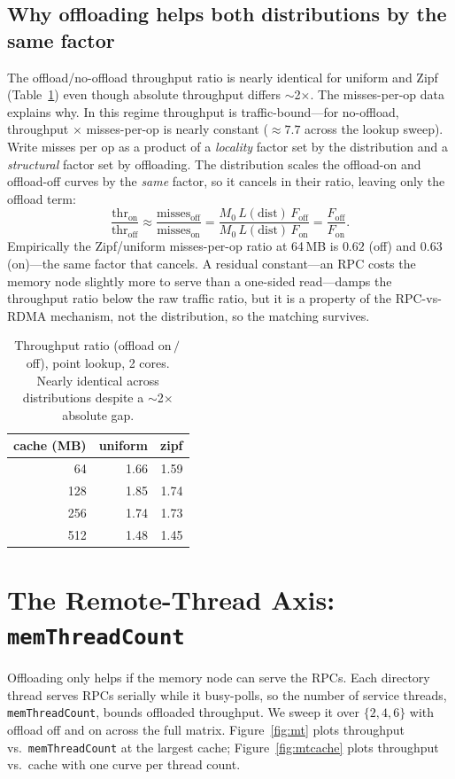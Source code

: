 \documentclass[sigconf,nonacm]{acmart}
\begin{document}
\subsection{Why offloading helps both distributions by the same factor}
The offload/no-offload throughput ratio is nearly identical for uniform and Zipf
(Table~\ref{tab:ratio}) even though absolute throughput differs $\sim$2$\times$.
The misses-per-op data explains why. In this regime throughput is
traffic-bound---for no-offload, throughput$\,\times\,$misses-per-op is nearly
constant ($\approx7.7$ across the lookup sweep). Write misses per op as a product
of a \emph{locality} factor set by the distribution and a \emph{structural} factor
set by offloading. The distribution scales the offload-on and offload-off curves
by the \emph{same} factor, so it cancels in their ratio, leaving only the offload
term:
\[
\frac{\text{thr}_\text{on}}{\text{thr}_\text{off}}
\approx\frac{\text{misses}_\text{off}}{\text{misses}_\text{on}}
=\frac{M_0\,L(\text{dist})\,F_\text{off}}{M_0\,L(\text{dist})\,F_\text{on}}
=\frac{F_\text{off}}{F_\text{on}} .
\]
Empirically the Zipf/uniform misses-per-op ratio at 64\,MB is $0.62$ (off) and
$0.63$ (on)---the same factor that cancels. A residual constant---an RPC costs the
memory node slightly more to serve than a one-sided read---damps the throughput
ratio below the raw traffic ratio, but it is a property of the RPC-vs-RDMA
mechanism, not the distribution, so the matching survives.

\begin{table}[t]
  \centering
  \caption{Throughput ratio (offload on\,$/$\,off), point lookup, 2 cores. Nearly
  identical across distributions despite a $\sim$2$\times$ absolute gap.}
  \label{tab:ratio}
  \small
  \begin{tabular}{r rr}
    \toprule
    cache (MB) & uniform & zipf \\
    \midrule
    64  & 1.66 & 1.59 \\
    128 & 1.85 & 1.74 \\
    256 & 1.74 & 1.73 \\
    512 & 1.48 & 1.45 \\
    \bottomrule
  \end{tabular}
\end{table}

\section{The Remote-Thread Axis: \texttt{memThreadCount}}
\label{sec:memthreads}
Offloading only helps if the memory node can serve the RPCs. Each directory
thread serves RPCs serially while it busy-polls, so the number of service
threads, \texttt{memThreadCount}, bounds offloaded throughput. We sweep it over
$\{2,4,6\}$ with offload off and on across the full matrix.
Figure~\ref{fig:mt} plots throughput vs.\ \texttt{memThreadCount} at the largest
cache; Figure~\ref{fig:mtcache} plots throughput vs.\ cache with one curve per
thread count.
\end{document}

